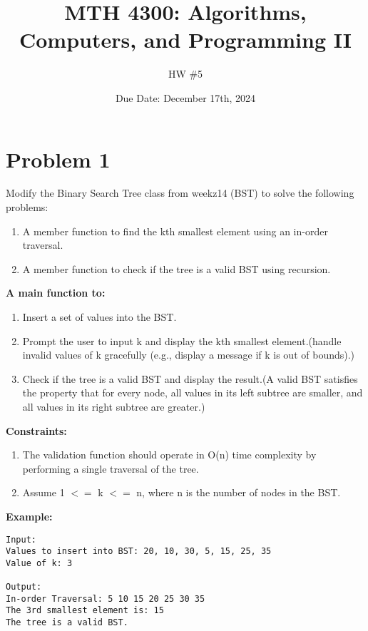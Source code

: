 \documentclass[a4paper]{article}
\title{MTH 4300: Algorithms, Computers, and Programming II}
\author{HW \#5}
\date{Due Date: December 17th, 2024}
\begin{document}
\maketitle


\section*{Problem 1}
Modify the  Binary Search Tree class from weekz14 (BST) to solve the following problems:\\

\begin{enumerate}
        \item A member function to find the kth smallest element using an in-order traversal.
        \item A member function to check if the tree is a valid BST using recursion.
\end{enumerate}

\textbf{A main function to:}
\begin{enumerate}
        \item Insert a set of values into the BST.
        \item Prompt the user to input k and display the kth smallest element.(handle invalid values of k gracefully (e.g., display a message if k is out of bounds).)
        \item Check if the tree is a valid BST and display the result.(A valid BST satisfies the property that for every node, all values in its left subtree are smaller, and all values in its right subtree are greater.)
\end{enumerate}


\textbf{Constraints:}
\begin{enumerate}
        \item The validation function should operate in O(n) time complexity by performing a single traversal of the tree.
        \item Assume 1 $<=$ k $<=$ n, where n is the number of nodes in the BST.
\end{enumerate}


\textbf{Example:}
\begin{verbatim}
Input:
Values to insert into BST: 20, 10, 30, 5, 15, 25, 35
Value of k: 3

Output:
In-order Traversal: 5 10 15 20 25 30 35
The 3rd smallest element is: 15
The tree is a valid BST.      
\end{verbatim}
\end{document}
